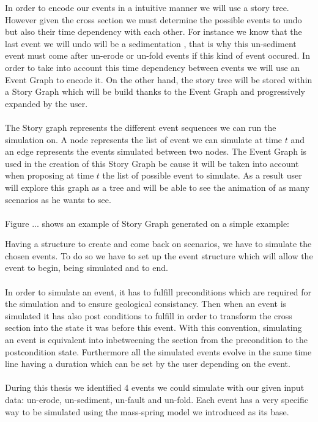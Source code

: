 \documentclass[12pt, a4paper]{report} %
\begin{document}
In order to encode our events in a intuitive manner we will use a story tree. However given the cross section we must determine the possible events to undo but also their time dependency with each other. For instance we know that the last event we will undo will be a sedimentation , that is why this un-sediment event must come after un-erode or un-fold events if this kind of event occured. In order to take into account this time dependency between events we will use an Event Graph to encode it. On the other hand, the story tree will be stored within a Story Graph which will be build thanks to the Event Graph and progressively expanded by the user.\\\\

The Story graph represents the different event sequences we can run the simulation on. A node represents the list of event we can simulate at time $t$ and an edge represents the events simulated between two nodes. The Event Graph is used in the creation of this Story Graph be cause it will be taken into account when proposing at time $t$ the list of possible event to simulate. As a result user will explore this graph as a tree and will be able to see the animation of as many scenarios as he wants to see.\\\\

Figure ... shows an example of Story Graph generated on a simple example:


Having a structure to create and come back on scenarios, we have to simulate the chosen events. To do so we have to set up the event structure which will allow the event to begin, being simulated and to end.\\\\

In order to simulate an event, it has to fulfill preconditions which are required for the simulation and to ensure geological consistancy. Then when an event is simulated it has also post conditions to fulfill in order to transform the cross section into the state it was before this event. With this convention, simulating an event is equivalent into inbetweening the section from the precondition to the postcondition state. Furthermore all the simulated events evolve in the same time line having a duration which can be set by the user depending on the event.\\\\

During this thesis we identified 4 events we could simulate with our given input data: un-erode, un-sediment, un-fault and un-fold. Each event has a very specific way to be simulated using the mass-spring model we introduced as its base.\\\\
\end{document}
